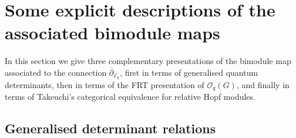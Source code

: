 \documentclass[pdftex]{sigma}
\numberwithin{equation}{section}
\newcommand\adel{\overline{\partial}}
\begin{document}

\section{Some explicit descriptions of the associated bimodule maps}\label{section4}

In this section we give three complementary presentations of the bimodule map associated to the connection $\adel_{\mathcal{E}_k}$, first in terms of generalised quantum determinants, then in terms of the FRT presentation of $\mathcal{O}_q(G)$, and finally in terms of Takeuchi's categorical equivalence for relative Hopf modules.

\subsection{Generalised determinant relations} \label{textsection:genDets}
\end{document}
